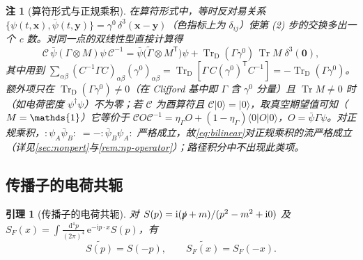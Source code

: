 \documentclass[UTF8,a4paper,11pt,fontset=fandol]{ctexart}
\let\amsmathbb\mathbb
\renewcommand{\mathbb}[1]{\ifx1#1\mathds{1}\else\amsmathbb{#1}\fi}
\theoremstyle{cplain}
\newtheorem{lemma}[theorem]{引理}
\theoremstyle{cdefinition}
\theoremstyle{cremark}
\newtheorem{remark}[theorem]{注}
\numberwithin{equation}{section}
\DeclareMathOperator{\Tr}{Tr}
\newcommand{\TrD}{\operatorname{Tr}_{\mathrm{D}}}   %
\newcommand{\sla}[1]{\slashed{#1}}                  %
\newcommand{\dd}{\mathrm{d}}                         %
\newcommand{\tp}{\mathsf{T}}                         %
\newcommand{\Cop}{\mathcal{C}}                       %
\newcommand{\SF}{S_{F}}                              %
\newcommand{\ii}{\mathrm{i}}                        %
\newcommand{\ee}{\mathrm{e}}                        %
\newcommand{\Cconj}[1]{\widetilde{#1}}              %
\begin{document}
\begin{remark}[算符形式与正规乘积]\label{rem:dirac-operator}
在算符形式中，等时反对易关系 $\{\psi(t,\bm x),\bar\psi(t,\bm y)\}=\gamma^0\,\delta^3(\bm x-\bm y)$（色指标上为 $\delta_{ij}$）使第 (2) 步的交换多出一个 c 数。对同一点的双线性型直接计算得
\begin{equation}\label{eq:dirac-cnumber}
\Cop\,\bar\psi(\Gamma\otimes M)\psi\,\Cop^{-1}=\bar\psi\bigl(\Cconj\Gamma\otimes M^{\tp}\bigr)\psi+\TrD(\Gamma\gamma^0)\,\Tr M\;\delta^3(\bm 0),
\end{equation}
其中用到 $\sum_{\alpha\beta}(C^{-1}\Gamma C)_{\alpha\beta}(\gamma^0)_{\alpha\beta}=\TrD[\Gamma\,C(\gamma^0)^{\tp}C^{-1}]=-\TrD(\Gamma\gamma^0)$。额外项只在 $\TrD(\Gamma\gamma^0)\neq0$（在 Clifford 基中即 $\Gamma$ 含 $\gamma^0$ 分量）且 $\Tr M\neq0$ 时（如电荷密度 $\psi^\dagger\psi$）不为零；若 $\Cop$ 为酉算符且 $\Cop|0\rangle=|0\rangle$，取真空期望值可知（$M=\mathbb 1$）它等价于 $\Cop O\Cop^{-1}=\eta_\Gamma O+(1-\eta_\Gamma)\langle0|O|0\rangle$，$O=\bar\psi\Gamma\psi$。对正规乘积，$:\!\psi_A\bar\psi_B\!:\;=-:\!\bar\psi_B\psi_A\!:$ 严格成立，故\cref{eq:bilinear}对正规乘积的流严格成立（详见\cref{sec:nonpert}与\cref{rem:np-operator}）；路径积分中不出现此类项。
\end{remark}

\subsection{传播子的电荷共轭}\label{sec:dirac-propagator}

\begin{lemma}[传播子的电荷共轭]\label{lem:propagator}
对 $S(p)=\ii(\sla p+m)/(p^2-m^2+\ii0)$ 及 $\SF(x)=\int\frac{\dd^4p}{(2\pi)^4}\,\ee^{-\ii p\cdot x}S(p)$，有
\begin{equation}\label{eq:C-prop}
\Cconj{S(p)}=S(-p),\qquad \Cconj{\SF(x)}=\SF(-x).
\end{equation}
\end{lemma}
\end{document}

